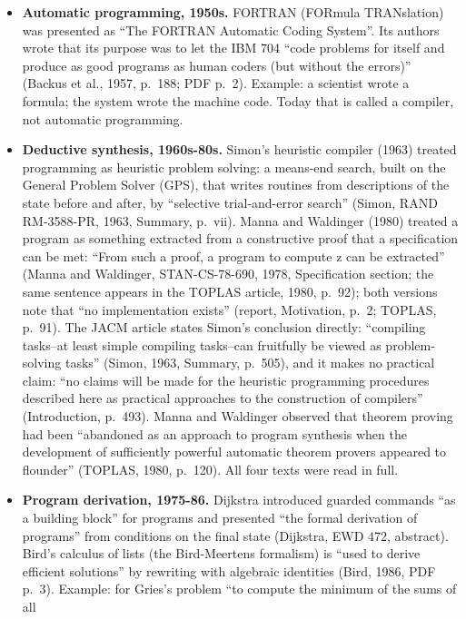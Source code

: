\documentclass[10pt,letterpaper]{article}
\providecommand{\tightlist}{\setlength{\itemsep}{1pt}\setlength{\parskip}{0pt}}
\begin{document}
\begin{itemize}
\tightlist
\item
  \textbf{Automatic programming, 1950s.} FORTRAN (FORmula TRANslation)
  was presented as ``The FORTRAN Automatic Coding System''. Its authors
  wrote that its purpose was to let the IBM 704 ``code problems for
  itself and produce as good programs as human coders (but without the
  errors)'' (Backus et al., 1957, p.~188; PDF p.~2). Example: a
  scientist wrote a formula; the system wrote the machine code. Today
  that is called a compiler, not automatic programming.
\item
  \textbf{Deductive synthesis, 1960s-80s.} Simon's heuristic compiler
  (1963) treated programming as heuristic problem solving: a means-end
  search, built on the General Problem Solver (GPS), that writes
  routines from descriptions of the state before and after, by
  ``selective trial-and-error search'' (Simon, RAND RM-3588-PR, 1963,
  Summary, p.~vii). Manna and Waldinger (1980) treated a program as
  something extracted from a constructive proof that a specification can
  be met: ``From such a proof, a program to compute z can be extracted''
  (Manna and Waldinger, STAN-CS-78-690, 1978, Specification section; the
  same sentence appears in the TOPLAS article, 1980, p.~92); both
  versions note that ``no implementation exists'' (report, Motivation,
  p.~2; TOPLAS, p.~91). The JACM article states Simon's conclusion
  directly: ``compiling tasks--at least simple compiling tasks--can
  fruitfully be viewed as problem-solving tasks'' (Simon, 1963, Summary,
  p.~505), and it makes no practical claim: ``no claims will be made for
  the heuristic programming procedures described here as practical
  approaches to the construction of compilers'' (Introduction, p.~493).
  Manna and Waldinger observed that theorem proving had been ``abandoned
  as an approach to program synthesis when the development of
  sufficiently powerful automatic theorem provers appeared to flounder''
  (TOPLAS, 1980, p.~120). All four texts were read in full.
\item
  \textbf{Program derivation, 1975-86.} Dijkstra introduced guarded
  commands ``as a building block'' for programs and presented ``the
  formal derivation of programs'' from conditions on the final state
  (Dijkstra, EWD 472, abstract). Bird's calculus of lists (the
  Bird-Meertens formalism) is ``used to derive efficient solutions'' by
  rewriting with algebraic identities (Bird, 1986, PDF p.~3). Example:
  for Gries's problem ``to compute the minimum of the sums of all

\end{itemize}
\end{document}
